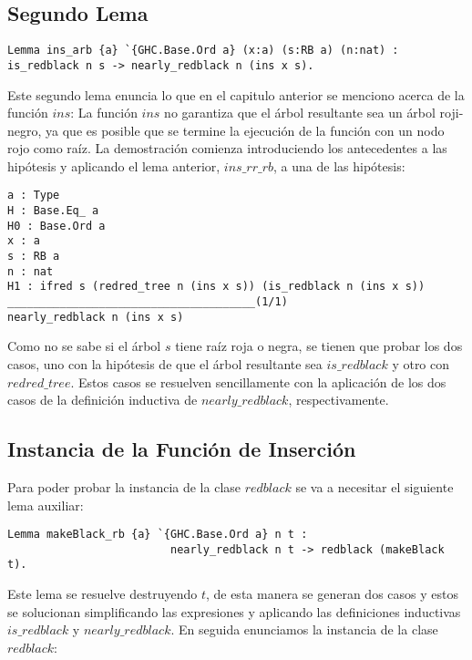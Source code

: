 \documentclass[letterpaper,12pt,oneside]{book}
\newcommand{\arn}{árbol roji-negro}
\theoremstyle{plain}
\theoremstyle{definition}
\theoremstyle{remark}
\begin{document}
\subsection{Segundo Lema}

\begin{verbatim}
Lemma ins_arb {a} `{GHC.Base.Ord a} (x:a) (s:RB a) (n:nat) : 
is_redblack n s -> nearly_redblack n (ins x s).
\end{verbatim}

Este segundo lema enuncia lo que en el capitulo anterior se menciono acerca de la funci\'on $ins$: La funci\'on $ins$ 
no garantiza que el \'arbol resultante sea un {\arn}, ya que es posible que se termine la ejecuci\'on de la funci\'on 
con un nodo rojo como raíz. La demostraci\'on comienza introduciendo los antecedentes a las hipótesis y aplicando el 
lema anterior, $ins\_rr\_rb$, a una de las hip\'otesis:

\begin{verbatim}
a : Type
H : Base.Eq_ a
H0 : Base.Ord a
x : a
s : RB a
n : nat
H1 : ifred s (redred_tree n (ins x s)) (is_redblack n (ins x s))
______________________________________(1/1)
nearly_redblack n (ins x s)

\end{verbatim}

Como no se sabe si el \'arbol $s$ tiene ra\'iz roja o negra, se tienen que probar los dos casos, uno con la hipótesis 
de que el \'arbol resultante sea $is\_redblack$ y otro con $redred\_tree$. Estos casos se resuelven sencillamente con 
la aplicación de los dos casos de la definici\'on inductiva de $nearly\_redblack$, respectivamente.

\subsection{Instancia de la Funci\'on de Inserci\'on}

Para poder probar la instancia de la clase $redblack$ se va a necesitar el siguiente lema auxiliar:

\begin{verbatim}
Lemma makeBlack_rb {a} `{GHC.Base.Ord a} n t : 
                         nearly_redblack n t -> redblack (makeBlack t).
\end{verbatim}

Este lema se resuelve destruyendo $t$, de esta manera se generan dos casos y estos se solucionan simplificando las 
expresiones y aplicando las definiciones inductivas $is\_redblack$ y $nearly\_redblack$. En seguida enunciamos la 
instancia de la clase $redblack$:
\end{document}
